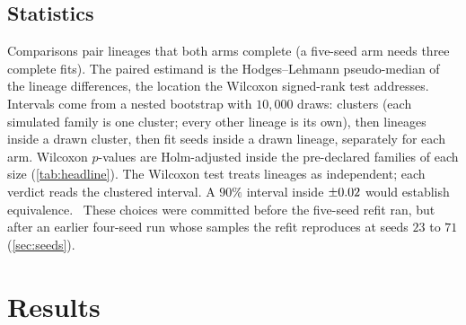 \documentclass{article} %
\begin{document}
\subsection{Statistics}
\label{sec:stats}
Comparisons pair lineages that both arms complete (a five-seed arm needs three complete fits). The paired estimand is the Hodges--Lehmann pseudo-median of the lineage differences, the location the Wilcoxon signed-rank test addresses. Intervals come from a nested bootstrap with $10{,}000$ draws: clusters (each simulated family is one cluster; every other lineage is its own), then lineages inside a drawn cluster, then fit seeds inside a drawn lineage, separately for each arm. Wilcoxon $p$-values are Holm-adjusted inside the pre-declared families of each size (\cref{tab:headline}). The Wilcoxon test treats lineages as independent; each verdict reads the clustered interval. A $90\%$ interval inside $\pm0.02$ would establish equivalence. \VEquivSentence\ These choices were committed before the five-seed refit ran, but after an earlier four-seed run whose samples the refit reproduces at seeds $23$ to $71$ (\cref{sec:seeds}).

\section{Results}
\label{sec:results}
\end{document}
